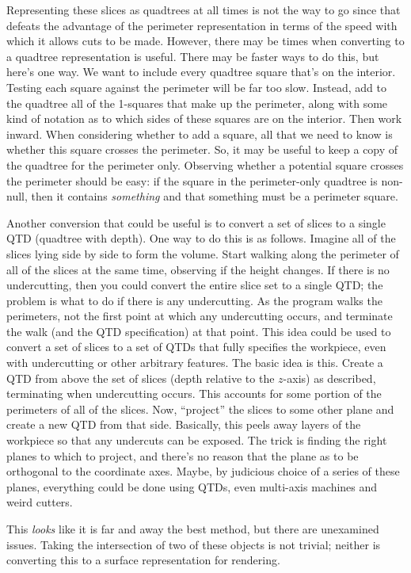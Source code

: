 \documentclass[titlepage,oneside,10pt]{article}
\begin{document}
Representing these slices as quadtrees at all times is not the way to
go since that defeats the advantage of the perimeter representation in
terms of the speed with which it allows cuts to be made. However,
there may be times when converting to a quadtree representation is
useful. There may be faster ways to do this, but here's one way. We
want to include every quadtree square that's on the interior. Testing
each square against the perimeter will be far too slow. Instead, add
to the quadtree all of the 1-squares that make up the perimeter, along
with some kind of notation as to which sides of these squares are on
the interior. Then work inward. When considering whether to add a
square, all that we need to know is whether this square crosses the
perimeter. So, it may be useful to keep a copy of the quadtree for the
perimeter only. Observing whether a potential square crosses the
perimeter should be easy: if the square in the perimeter-only quadtree
is non-null, then it contains \emph{something} and that something must
be a perimeter square.

Another conversion that could be useful is to convert a set of slices
to a single QTD (quadtree with depth). One way to do this is as
follows. Imagine all of the slices lying side by side to form the
volume. Start walking along the perimeter of all of the slices at the
same time, observing if the height changes. If there is no
undercutting, then you could convert the entire slice set to a single
QTD; the problem is what to do if there is any undercutting. As the
program walks the perimeters, not the first point at which any
undercutting occurs, and terminate the walk (and the QTD
specification) at that point. This idea could be used to convert a set
of slices to a set of QTDs that fully specifies the workpiece, even
with undercutting or other arbitrary features. The basic idea is
this. Create a QTD from above the set of slices (depth relative to the
$z$-axis) as described, terminating when undercutting occurs. This
accounts for some portion of the perimeters of all of the slices. Now,
``project'' the slices to some other plane and create a new QTD from
that side. Basically, this peels away layers of the workpiece so that
any undercuts can be exposed. The trick is finding the right planes to
which to project, and there's no reason that the plane as to be
orthogonal to the coordinate axes. Maybe, by judicious choice of a
series of these planes, everything could be done using QTDs, even
multi-axis machines and weird cutters.

This \emph{looks} like it is far and away the best method, but there
are unexamined issues. Taking the intersection of two of these objects
is not trivial; neither is converting this to a surface representation
for rendering.
\end{document}
